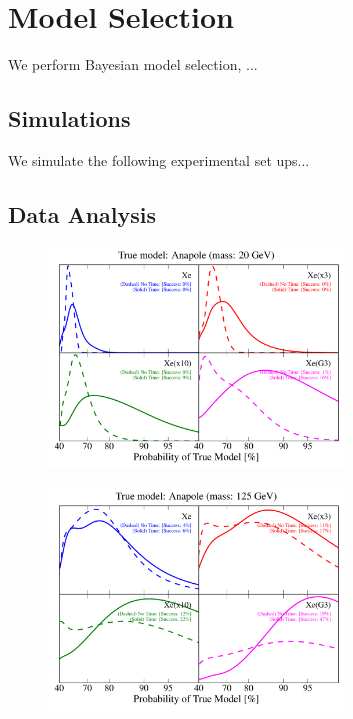 \documentclass[11pt]{article}
\begin{document}
\section{Model Selection}

We perform Bayesian model selection, ...

\subsection{Simulations}

We simulate the following experimental set ups...

\subsection{Data Analysis}

\begin{figure}
\centering
\includegraphics[width=0.7\textwidth]{plots/PDF_20GeV_Anapole_50sims_Xe_Xe3x_Xe10x_XeG3_GF_TNT.pdf}
\caption{\label{fig:500gev_anapole_XeFull_TNT_GF}}
\end{figure}

\begin{figure}
\centering
\includegraphics[width=0.7\textwidth]{plots/PDF_125GeV_Anapole_50sims_Xe_Xe3x_Xe10x_XeG3_GF_TNT.pdf}
\caption{\label{fig:500gev_anapole_XeFull_TNT_GF}}
\end{figure}
\end{document}
